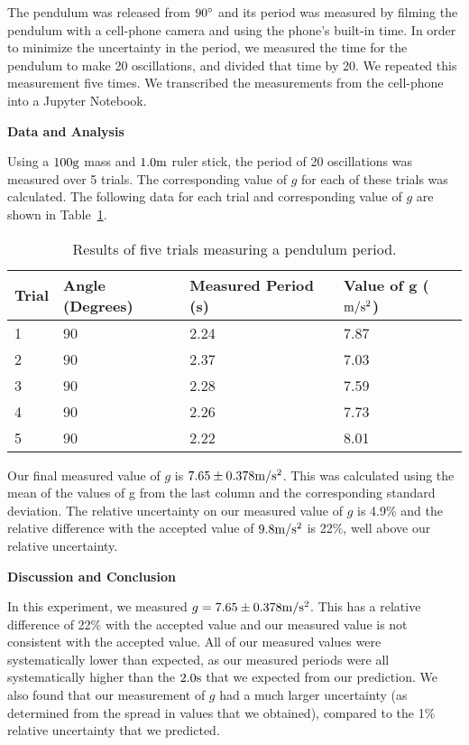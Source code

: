 The pendulum was released from $90\degree$ and its period was measured by filming the pendulum with a cell-phone camera and using the phone's built-in time. In order to minimize the uncertainty in the period, we measured the time for the pendulum to make 20 oscillations, and divided that time by 20. We repeated this measurement five times. We transcribed the measurements from the cell-phone into a Jupyter Notebook.

\textbf{Data and Analysis}

Using a $100 {\rm g}$ mass and $1.0 {\rm m}$ ruler stick, the period of 20 oscillations was measured over 5 trials. The corresponding value of $g$ for each of these trials was calculated. The following data for each trial and corresponding value of $g$ are shown in Table~\ref{tab:labs:exreport}.

\begin{table}
\centering
\caption[]{Results of five trials measuring a pendulum period.}
\label{tab:labs:exreport}
\begin{tabular}{p{}p{}p{}p{}}
\toprule
Trial & Angle (Degrees) & Measured Period (s) & Value of g (${\rm m/s^2}$) \\
\hline
1 & 90 & 2.24 & 7.87 \\
2 & 90 & 2.37 & 7.03 \\
3 & 90 & 2.28 & 7.59 \\
4 & 90 & 2.26 & 7.73 \\
5 & 90 & 2.22 & 8.01 \\
\bottomrule
\end{tabular}
\end{table}

Our final measured value of $g$ is $7.65\pm 0.378 {\rm m/s^2}$. This was calculated using the mean of the values of g from the last column and the corresponding standard deviation. The relative uncertainty on our measured value of $g$ is 4.9\% and the relative difference with the accepted value of $9.8 {\rm m/s^2}$ is 22\%, well above our relative uncertainty.

\textbf{Discussion and Conclusion}

In this experiment, we measured $g=7.65\pm 0.378 {\rm m/s^2}$. This has a relative difference of 22\% with the accepted value and our measured value is not consistent with the accepted value. All of our measured values were systematically lower than expected, as our measured periods were all systematically higher than the $2.0 {\rm s}$ that we expected from our prediction. We also found that our measurement of $g$ had a much larger uncertainty (as determined from the spread in values that we obtained), compared to the 1\% relative uncertainty that we predicted.

